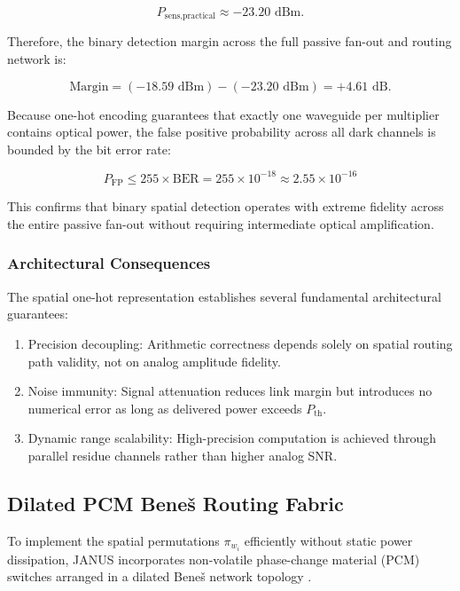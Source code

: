 \documentclass[journal]{IEEEtran}
\begin{document}
\begin{equation}
P_{\text{sens,practical}} \approx -23.20\text{ dBm}.
\end{equation}

Therefore, the binary detection margin across the full passive fan-out and routing network is:

\begin{equation}
\text{Margin} = (-18.59\text{ dBm}) - (-23.20\text{ dBm}) = +4.61\text{ dB}.
\end{equation}

Because one-hot encoding guarantees that exactly one waveguide per multiplier contains optical power, the false positive probability across all dark channels is bounded by the bit error rate:

\begin{equation}
P_{\mathrm{FP}} \le 255 \times \mathrm{BER} = 255 \times 10^{-18} \approx 2.55 \times 10^{-16}
\end{equation}

This confirms that binary spatial detection operates with extreme fidelity across the entire passive fan-out without requiring intermediate optical amplification.

\subsubsection{\textbf{Architectural Consequences}}

The spatial one-hot representation establishes several fundamental architectural guarantees:

\begin{enumerate}
\item Precision decoupling: Arithmetic correctness depends solely on spatial routing path validity, not on analog amplitude fidelity.
\item Noise immunity: Signal attenuation reduces link margin but introduces no numerical error as long as delivered power exceeds $P_{\mathrm{th}}$.
\item Dynamic range scalability: High-precision computation is achieved through parallel residue channels rather than higher analog SNR.
\end{enumerate}

\subsection{\textbf{Dilated PCM Beneš Routing Fabric}}

To implement the spatial permutations $\pi_{w_i}$ efficiently without static power dissipation, JANUS incorporates non-volatile phase-change material (PCM) switches arranged in a dilated Bene\v{s} network topology \cite{Fang2022}\cite{Zhang2021}\cite{Wuttig2017}\cite{Sinatkas2021}.
\end{document}
